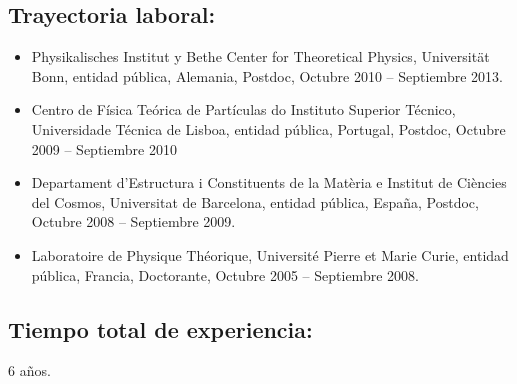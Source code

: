 \subsection{Trayectoria laboral:}
\begin{itemize}
\item Physikalisches Institut y Bethe Center for Theoretical Physics, Universität Bonn, entidad pública, Alemania, Postdoc, Octubre 2010 -- Septiembre 2013.
\item Centro de Física Teórica de Partículas do Instituto Superior Técnico, Universidade Técnica de Lisboa, entidad pública, Portugal, Postdoc, Octubre 2009 -- Septiembre 2010
\item Departament d'Estructura i Constituents de la Matèria e Institut de Ciències del Cosmos, Universitat de Barcelona, entidad pública, España, Postdoc, Octubre 2008 -- Septiembre 2009.
\item Laboratoire de Physique Théorique, Université Pierre et Marie Curie, entidad pública, Francia, Doctorante, Octubre 2005 -- Septiembre 2008.
\end{itemize}
\subsection{Tiempo total de experiencia:}
6 años.


